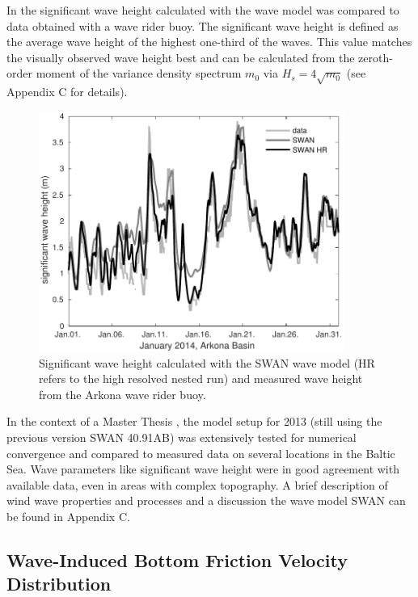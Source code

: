 In  the significant wave height calculated with the wave model was 
compared to data obtained with a wave rider buoy. The significant wave height 
is defined as the average wave height of the highest one-third of the waves. 
This value matches the visually observed wave height best and can be calculated 
from the zeroth-order moment of the variance density spectrum $m_0$ via 
$H_s = 4 \sqrt{m_0}$ (see Appendix C for details).
\begin{figure}[ht]
 \includegraphics[width=10cm]{bilder/januar.pdf}
 \caption{Significant wave height calculated with the SWAN wave model (HR 
refers to the high resolved nested run) and measured wave height from the 
Arkona wave rider buoy.\label{verify}}
\end{figure}

In the context of a Master Thesis \citep[][]{masterarbeitronja}, the model 
setup for 2013 (still using the previous version SWAN 40.91AB) was 
extensively tested for numerical convergence and compared to measured data on 
several locations in the Baltic Sea. Wave parameters like significant wave 
height were in good agreement with available data, even in areas with complex 
topography. A brief description of wind wave properties and processes and a 
discussion the wave model SWAN can be found in Appendix C.

\subsection{Wave-Induced Bottom Friction Velocity Distribution}

